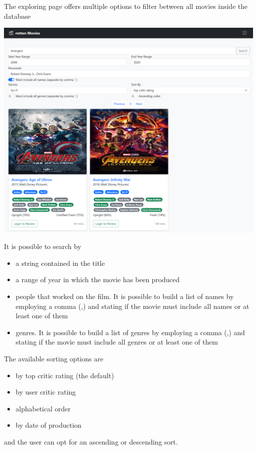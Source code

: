 The exploring page offers multiple options to filter between all movies inside the database
\begin{center}
\includegraphics[scale=0.45]{../../../images/user_manual/search_query.png} 
\end{center}
\vspace{5pt}

It is possible to search by 
\begin{itemize}
\item a string contained in the title
\item a range of year in which the movie has been produced
\item people that worked on the film. It is possible to build a list of names by employing a comma (,) and stating if the movie must include all names or at least one of them
\item genres. It is possible to build a list of genres by employing a comma (,) and stating if the movie must include all genres or at least one of them
\end{itemize}

The available sorting options are
\begin{itemize}
\item by top critic rating (the default)
\item by user critic rating
\item alphabetical order
\item by date of production
\end{itemize}
and the user can opt for an ascending or descending sort.

